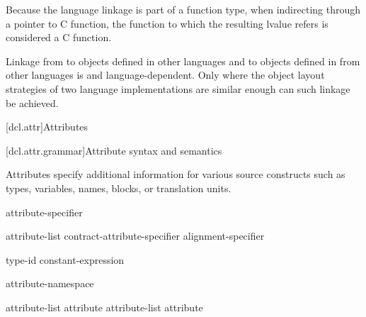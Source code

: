 \pnum
\begin{note}
Because the language linkage is part of a function type, when
indirecting through a pointer to C function, the function to
which the resulting lvalue refers is considered a C function.
\end{note}

\pnum
{}%
%
Linkage from \Cpp{} to objects defined in other languages and to objects
defined in \Cpp{} from other languages is  and
language-dependent. Only where the object layout strategies of two
language implementations are similar enough can such linkage be
achieved.%

[dcl.attr]{Attributes}%

[dcl.attr.grammar]{Attribute syntax and semantics}

\pnum
{}%
Attributes specify additional information for various source constructs
such as types, variables, names, blocks, or translation units.

\begin{bnf}
\br
   attribute-specifier
\end{bnf}

\begin{bnf}
\br
  \terminal{[} \terminal{[}  attribute-list \terminal{]} \terminal{]}\br
  contract-attribute-specifier\br
  alignment-specifier
\end{bnf}

\begin{bnf}
\br
   \terminal{(} type-id  \terminal{)}\br
   \terminal{(} constant-expression  \terminal{)}
\end{bnf}

\begin{bnf}
\br
   attribute-namespace \terminal{:}
\end{bnf}

\begin{bnf}
\br
  \br
  attribute-list \terminal{,} \br
  attribute \br
  attribute-list \terminal{,} attribute 
\end{bnf}

